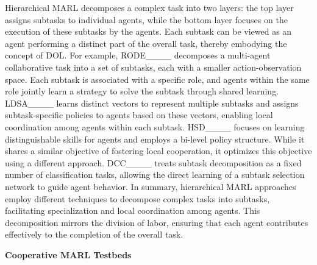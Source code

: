 Hierarchical MARL decomposes a complex task into two layers: the top layer assigns subtasks to individual agents, while the bottom layer focuses on the execution of these subtasks by the agents. Each subtask can be viewed as an agent performing a distinct part of the overall task, thereby embodying the concept of DOL.
For example, RODE____ decomposes a multi-agent collaborative task into a set of subtasks, each with a smaller action-observation space. Each subtask is associated with a specific role, and agents within the same role jointly learn a strategy to solve the subtask through shared learning.
LDSA____ learns distinct vectors to represent multiple subtasks and assigns subtask-specific policies to agents based on these vectors, enabling local coordination among agents within each subtask.
HSD____ focuses on learning distinguishable skills for agents and employs a bi-level policy structure. While it shares a similar objective of fostering local cooperation, it optimizes this objective using a different approach.
DCC____ treats subtask decomposition as a fixed number of classification tasks, allowing the direct learning of a subtask selection network to guide agent behavior.
In summary, hierarchical MARL approaches employ different techniques to decompose complex tasks into subtasks, facilitating specialization and local coordination among agents. This decomposition mirrors the division of labor, ensuring that each agent contributes effectively to the completion of the overall task.


\textbf{Cooperative MARL Testbeds}

